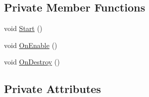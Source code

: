 \subsection*{Private Member Functions}
\begin{DoxyCompactItemize}
\item 
void \mbox{\hyperlink{class_museum_build_observer_a18c844a9fe9b649ed4bdaedbdade82a6}{Start}} ()
\item 
void \mbox{\hyperlink{class_museum_build_observer_aa6fcd74a0a516329511ccbdafcb5e6f0}{On\+Enable}} ()
\item 
void \mbox{\hyperlink{class_museum_build_observer_a4bd33ad4fee577f34f861c4d92d8bff4}{On\+Destroy}} ()
\end{DoxyCompactItemize}
\subsection*{Private Attributes}
